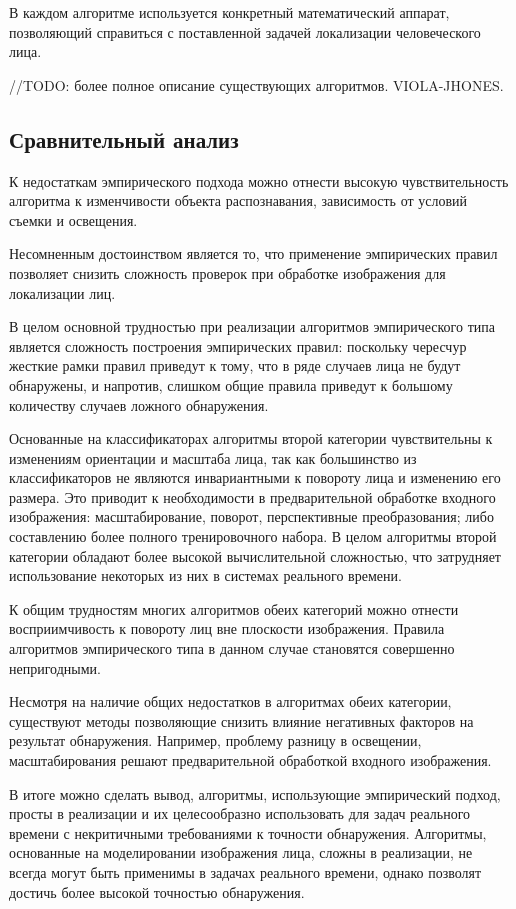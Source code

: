 В каждом алгоритме используется конкретный математический аппарат, позволяющий
справиться с поставленной задачей локализации человеческого лица.

//TODO: более полное описание существующих алгоритмов. VIOLA-JHONES.

\subsection{Сравнительный анализ}

К недостаткам эмпирического подхода можно отнести высокую чувствительность
алгоритма к изменчивости объекта распознавания, зависимость от условий съемки и
освещения.

Несомненным достоинством является то, что применение эмпирических правил
позволяет снизить сложность проверок при обработке изображения для локализации
лиц.

В целом основной трудностью при реализации алгоритмов эмпирического типа
является сложность построения эмпирических правил: поскольку чересчур жесткие
рамки правил приведут к тому, что в ряде случаев лица не будут обнаружены, и
напротив, слишком общие правила приведут к большому количеству случаев ложного
обнаружения. 

Основанные на классификаторах алгоритмы второй категории чувствительны к
изменениям ориентации и масштаба лица, так как большинство из классификаторов
не являются инвариантными к повороту лица и изменению его размера. Это приводит
к необходимости в предварительной обработке входного изображения:
масштабирование, поворот, перспективные преобразования; либо составлению более
полного тренировочного набора. В целом алгоритмы второй категории обладают
более высокой вычислительной сложностью, что затрудняет использование некоторых
из них в системах реального времени.


К общим трудностям многих алгоритмов обеих категорий можно отнести
восприимчивость к повороту лиц вне плоскости изображения. Правила алгоритмов
эмпирического типа в данном случае становятся совершенно непригодными.

Несмотря на наличие общих недостатков в алгоритмах обеих категории, существуют
методы позволяющие снизить влияние негативных факторов на результат
обнаружения. Например, проблему разницу в освещении, масштабирования решают
предварительной обработкой входного изображения.

В итоге можно сделать вывод, алгоритмы, использующие эмпирический подход,
просты в реализации и их целесообразно использовать для задач реального времени
с некритичными требованиями к точности обнаружения. Алгоритмы, основанные на
моделировании изображения лица, сложны в реализации, не всегда могут быть
применимы в задачах реального времени, однако позволят достичь более
высокой точностью обнаружения.


